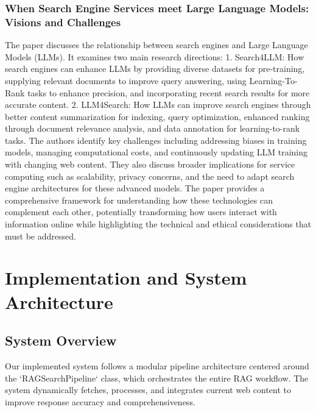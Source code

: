 \documentclass[fleqn,moreauthors,10pt]{ds_report}
\begin{document}
\subsubsection{When Search Engine Services meet Large Language Models: Visions and Challenges}  
  
The paper discusses the relationship between search engines and Large Language Models (LLMs). It examines two main research directions:  
	1.	Search4LLM: How search engines can enhance LLMs by providing diverse datasets for pre-training, supplying relevant documents to improve query answering, using Learning-To-Rank tasks to enhance precision, and incorporating recent search results for more accurate content.  
	2.	LLM4Search: How LLMs can improve search engines through better content summarization for indexing, query optimization, enhanced ranking through document relevance analysis, and data annotation for learning-to-rank tasks.  
The authors identify key challenges including addressing biases in training models, managing computational costs, and continuously updating LLM training with changing web content. They also discuss broader implications for service computing such as scalability, privacy concerns, and the need to adapt search engine architectures for these advanced models.  
The paper provides a comprehensive framework for understanding how these technologies can complement each other, potentially transforming how users interact with information online while highlighting the technical and ethical considerations that must be addressed. \cite{xiong2024}  
  
\section*{Implementation and System Architecture}  
  
\subsection*{System Overview}  
Our implemented system follows a modular pipeline architecture centered around the `RAGSearchPipeline` class, which orchestrates the entire RAG workflow. The system dynamically fetches, processes, and integrates current web content to improve response accuracy and comprehensiveness.  
  
\end{document}
